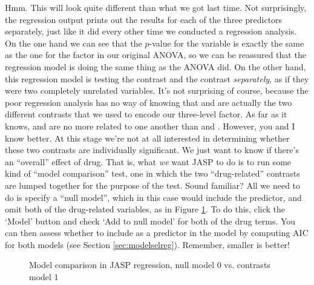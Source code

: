 Hmm. This will look quite different than what we got last time. Not surprisingly, the regression output prints out the results for each of the three predictors separately, just like it did every other time we conducted a regression analysis. On the one hand we can see that the $p$-value for the  variable is exactly the same as the one for the  factor in our original ANOVA, so we can be reassured that the regression model is doing the same thing as the ANOVA did. On the other hand, this regression model is testing the  contrast and the  contrast {\it separately}, as if they were two completely unrelated variables. It's not surprising of course, because the poor regression analysis has no way of knowing that  and  are actually the two different contrasts that we used to encode our three-level  factor. As far as it knows,  and  are no more related to one another than  and . However, you and I know better. At this stage we're not at all interested in determining whether these two contrasts are individually significant. We just want to know if there's an ``overall'' effect of drug. That is, what {\it we} want JASP to do is to run some kind of ``model comparison'' test, one in which the two ``drug-related'' contrasts are lumped together for the purpose of the test. Sound familiar? All we need to do is specify a ``null model'', which in this case would include the  predictor, and omit both of the drug-related variables, as in Figure \ref{fig:factorialanova11}. To do this, click the `Model' button and check `Add to null model' for both of the drug terms. You can then assess whether to include  as a predictor in the model by computing AIC for both models (see Section \ref{sec:modelselreg}).  Remember, smaller is better!

\begin{figure}[p]
\begin{center}
\caption{Model comparison in JASP regression, null model 0 vs. contrasts model 1}
\label{fig:factorialanova11}
\HR
\end{center}
\end{figure}


